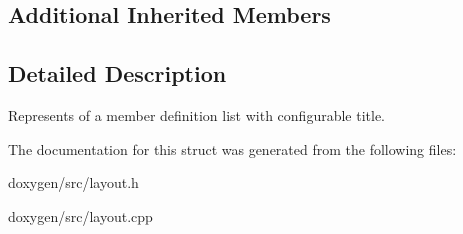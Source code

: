 \subsection*{Additional Inherited Members}


\subsection{Detailed Description}
Represents of a member definition list with configurable title. 

The documentation for this struct was generated from the following files\+:\begin{DoxyCompactItemize}
\item 
doxygen/src/layout.\+h\item 
doxygen/src/layout.\+cpp\end{DoxyCompactItemize}

